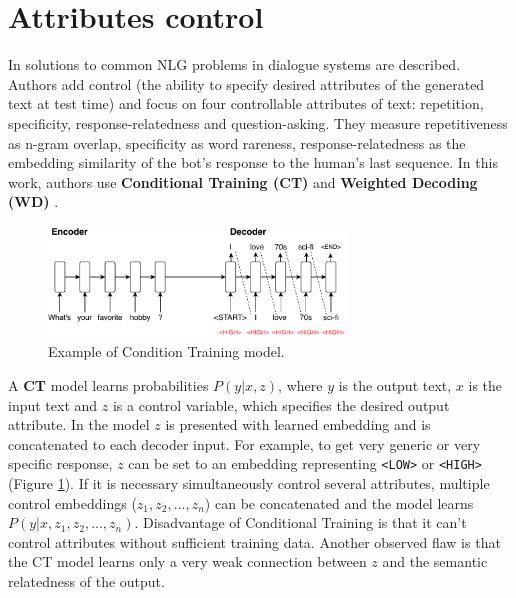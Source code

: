 \section{Attributes control}

In \cite{see2019makes} solutions to common NLG problems in dialogue systems are described. Authors add control (the ability to specify desired attributes of the generated text at test time) and focus on four controllable attributes of text: repetition, specificity, response-relatedness and question-asking. They measure repetitiveness as n-gram overlap, specificity as word rareness, response-relatedness as the embedding similarity of the bot’s response to the human’s last sequence. In this work, authors use \textbf{Conditional Training (CT)} \cite{peng2018towards} and \textbf{Weighted Decoding (WD)} \cite{ghazvininejad2017hafez}. 

\begin{figure}[hbt]
  \centering
  \includegraphics[width=0.7\textwidth]{figures/ct.pdf}
  \caption{Example of Condition Training model.}
  \label{fig:ct}
\end{figure}

A \textbf{CT} model learns probabilities $P(y|x,z)$, where $y$ is the output text, $x$ is the input text and $z$ is a control variable, which specifies the desired output attribute. In the model $z$ is presented with learned embedding and is concatenated to each decoder input. For example, to get very generic or very specific response, $z$ can be set to an embedding representing \texttt{<LOW>} or \texttt{<HIGH>} (Figure \ref{fig:ct}). If it is necessary simultaneously control several attributes, multiple control embeddings ($z_1, z_2, ..., z_n$) can be concatenated and the model learns $P(y|x, z_1, z_2, ..., z_n)$. Disadvantage of Conditional Training is that it can’t control attributes without sufficient training data. Another observed flaw is that the CT model learns only a very weak connection between $z$ and the semantic relatedness of the output.

